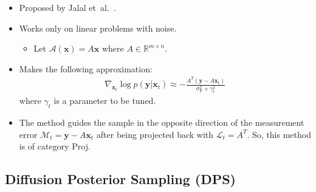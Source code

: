 \documentclass[10pt]{article}
\newcommand{\ve}[1]{\mathbf{#1}}
\newcommand{\etal}{{et~al.}}
\newcommand{\mcal}[1]{\mathcal{#1}}
\newcommand{\Real}{\mathbb{R}}
\begin{document}
\begin{itemize}
  \item Proposed by Jalal \etal~\cite{Jalal:ScoreALD:2021}.
  
  \item Works only on linear problems with noise.
  \begin{itemize}
    \item Let $\mcal{A}(\ve{x}) = A\ve{x}$ where $A \in \Real^{m \times n}$.  
  \end{itemize}   
  
  \item Makes the following approximation:
  \begin{align*}
    \nabla_{\ve{x}_t} \log p(\ve{y}|\ve{x}_t) \approx - \frac{A^T (\ve{y} - A\ve{x}_t)}{\sigma_\ve{y}^2 + \gamma_t^2}
  \end{align*}
  where $\gamma_t$ is a parameter to be tuned.
  
  \item The method guides the sample in the opposite direction of the measurement error $\mcal{M}_t = \ve{y} - A\ve{x}_t$ after being projected back with $\mcal{L}_t = A^T$. So, this method is of category Proj.
\end{itemize}

\subsection{Diffusion Posterior Sampling (DPS)}
\end{document}
